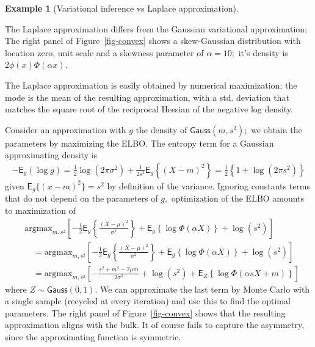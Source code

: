 \documentclass[
  11pt,
  letterpaper,
]{scrbook}
\theoremstyle{definition}
\newtheorem{example}{Example}[chapter]
\theoremstyle{plain}
\theoremstyle{plain}
\theoremstyle{plain}
\theoremstyle{definition}
\theoremstyle{definition}
\theoremstyle{plain}
\theoremstyle{plain}
\theoremstyle{remark}
\begin{document}
\begin{example}[Variational inference vs Laplace
approximation]\protect\hypertarget{exm-varional-vs-laplace}{}\label{exm-varional-vs-laplace}

The Laplace approximation differs from the Gaussian variational
approximation; The right panel of Figure~\ref{fig-convex} shows a
skew-Gaussian distribution with location zero, unit scale and a skewness
parameter of \(\alpha=10;\) it's density is \(2\phi(x)\Phi(\alpha x).\)

The Laplace approximation is easily obtained by numerical maximization;
the mode is the mean of the resulting approximation, with a std.
deviation that matches the square root of the reciprocal Hessian of the
negative log density.

Consider an approximation with \(g\) the density of
\(\mathsf{Gauss}(m, s^2);\) we obtain the parameters by maximizing the
ELBO. The entropy term for a Gaussian approximating density is
\begin{align*}
-\mathsf{E}_g(\log g) = \frac{1}{2}\log(2\pi \sigma^2) + \frac{1}{2s^2}\mathsf{E}_g\left\{(X-m)^2 \right\} = \frac{1}{2} \left\{1+\log(2\pi s^2)\right\}
\end{align*} given \(\mathsf{E}_g\{(x-m)^2\}=s^2\) by definition of the
variance. Ignoring constants terms that do not depend on the parameters
of \(g,\) optimization of the ELBO amounts to maximization of
\begin{align*}
&\mathrm{argmax}_{m, s^2} \left[-\frac{1}{2} \mathsf{E}_g \left\{ \frac{(X-\mu)^2}{\sigma^2}\right\} + \mathsf{E}_g\left\{\log \Phi(\alpha X)\right\} + \log(s^2) \right] \\
&\quad =\mathrm{argmax}_{m, s^2} \left[ -\frac{1}{2} \mathsf{E}_g \left\{ \frac{(X-\mu)^2}{\sigma^2}\right\} + \mathsf{E}_g\left\{\log \Phi(\alpha X)\right\} + \log(s^2) \right]
\\&\quad =\mathrm{argmax}_{m, s^2} \left[ -\frac{s^2 + m^2 -2\mu m}{2\sigma^2} + \log(s^2) + \mathsf{E}_{Z}\left\{\log \Phi(\alpha sX+m)\right\} \right]
\end{align*} where \(Z \sim \mathsf{Gauss}(0,1).\) We can approximate
the last term by Monte Carlo with a single sample (recycled at every
iteration) and use this to find the optimal parameters. The right panel
of Figure~\ref{fig-convex} shows that the resulting approximation aligns
with the bulk. It of course fails to capture the asymmetry, since the
approximating function is symmetric.

\end{example}
\end{document}
